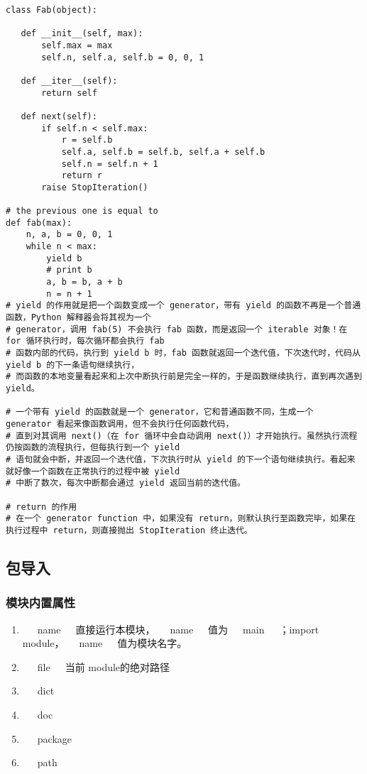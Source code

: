 \documentclass[11pt]{article}
\begin{document}
\begin{verbatim}
class Fab(object): 

   def __init__(self, max): 
       self.max = max 
       self.n, self.a, self.b = 0, 0, 1 

   def __iter__(self): 
       return self 

   def next(self): 
       if self.n < self.max: 
           r = self.b 
           self.a, self.b = self.b, self.a + self.b 
           self.n = self.n + 1 
           return r 
       raise StopIteration()

# the previous one is equal to
def fab(max): 
    n, a, b = 0, 0, 1 
    while n < max: 
        yield b 
        # print b 
        a, b = b, a + b 
        n = n + 1
# yield 的作用就是把一个函数变成一个 generator，带有 yield 的函数不再是一个普通函数，Python 解释器会将其视为一个
# generator，调用 fab(5) 不会执行 fab 函数，而是返回一个 iterable 对象！在 for 循环执行时，每次循环都会执行 fab
# 函数内部的代码，执行到 yield b 时，fab 函数就返回一个迭代值，下次迭代时，代码从 yield b 的下一条语句继续执行，
# 而函数的本地变量看起来和上次中断执行前是完全一样的，于是函数继续执行，直到再次遇到 yield。

# 一个带有 yield 的函数就是一个 generator，它和普通函数不同，生成一个 generator 看起来像函数调用，但不会执行任何函数代码，
# 直到对其调用 next()（在 for 循环中会自动调用 next()）才开始执行。虽然执行流程仍按函数的流程执行，但每执行到一个 yield
# 语句就会中断，并返回一个迭代值，下次执行时从 yield 的下一个语句继续执行。看起来就好像一个函数在正常执行的过程中被 yield
# 中断了数次，每次中断都会通过 yield 返回当前的迭代值。

# return 的作用
# 在一个 generator function 中，如果没有 return，则默认执行至函数完毕，如果在执行过程中 return，则直接抛出 StopIteration 终止迭代。
\end{verbatim}


\subsection{包导入}
\label{sec:org4b024c2}

\subsubsection{模块内置属性}
\label{sec:orgc3957df}
\begin{enumerate}
\item    name   直接运行本模块，   name   值为   main   ；import module，   name   值为模块名字。
\label{sec:org0fd8362}
\item    file   当前 module的绝对路径
\label{sec:orgd7d1754}
\item    dict   
\label{sec:orgcb3357e}
\item    doc   
\label{sec:org89d26f6}
\item    package   
\label{sec:org18fd9e8}
\item    path   
\label{sec:org0a29ab3}
\end{enumerate}
\end{document}

